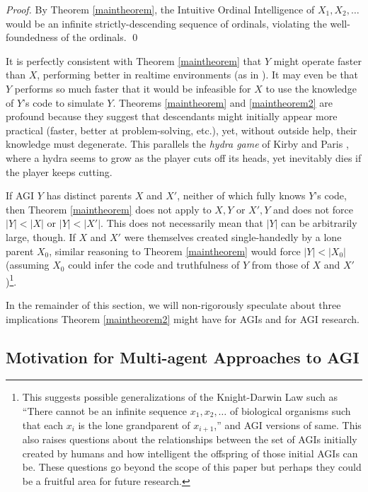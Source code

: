 \documentclass[runningheads]{llncs}
\begin{document}
\begin{proof}
By Theorem \ref{maintheorem}, the Intuitive Ordinal Intelligence of $X_1,X_2,\ldots$
would be an infinite strictly-descending sequence of ordinals, violating
the well-foundedness of the ordinals.
\qed
\end{proof}

It is perfectly consistent with
Theorem \ref{maintheorem} that $Y$ might operate faster
than $X$, performing better in realtime environments (as in \cite{gavane}).
It may even be that $Y$ performs so much faster that it would be infeasible for
$X$ to use the knowledge of $Y$'s code to simulate $Y$.
Theorems \ref{maintheorem} and \ref{maintheorem2} are profound because
they suggest that descendants might initially appear more practical
(faster, better at problem-solving, etc.),
yet, without outside help, their knowledge must degenerate.
This parallels the \emph{hydra game} of
Kirby and Paris \cite{kirby1982accessible}, where a hydra
seems to grow as the player cuts off its heads, yet
inevitably dies if the player keeps cutting.

If AGI $Y$ has distinct parents $X$ and $X'$, neither of which fully knows
$Y$'s code, then Theorem \ref{maintheorem} does not apply to $X,Y$ or $X',Y$ and
does not force
$|Y|<|X|$ or $|Y|<|X'|$. This does not necessarily mean that
$|Y|$ can be arbitrarily large, though. If $X$ and $X'$ were themselves
created single-handedly by a lone parent $X_0$, similar
reasoning to Theorem \ref{maintheorem} would force $|Y|<|X_0|$ (assuming $X_0$
could infer the code and truthfulness of $Y$ from those of $X$ and $X'$)\footnote{This
suggests possible generalizations of the Knight-Darwin Law such as ``There cannot be
an infinite sequence $x_1,x_2,\ldots$ of biological organisms such that each $x_i$
is the lone grandparent of $x_{i+1}$,'' and AGI versions of same. This also raises
questions about the relationships between the set of AGIs initially created by
humans and how intelligent the offspring of those initial AGIs can be. These questions
go beyond the scope of this paper but perhaps they could be a fruitful area for future
research.}.

In the remainder of this section, we will non-rigorously speculate about three implications
Theorem \ref{maintheorem2} might have for AGIs and for AGI research.


\subsection{Motivation for Multi-agent Approaches to AGI}
\end{document}

